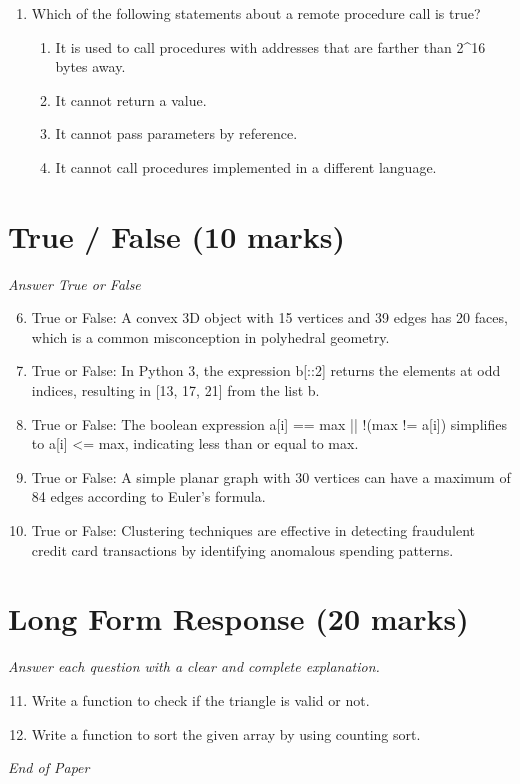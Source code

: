 \documentclass[12pt]{article}
\begin{document}
\begin{enumerate}[label=\arabic*.]
\begin{enumerate}[label=(\alph*)]
    \item 34.0
    \item 26.0
\end{enumerate}
\item Which of the following statements about a remote procedure call is true?
\begin{enumerate}[label=(\alph*)]
    \item It is used to call procedures with addresses that are farther than 2\^{}16 bytes away.
    \item It cannot return a value.
    \item It cannot pass parameters by reference.
    \item It cannot call procedures implemented in a different language.
\end{enumerate}
\end{enumerate}

\section*{True / False (10 marks)}
\textit{Answer True or False}
\begin{enumerate}[label=\arabic*.]
\setcounter{enumi}{5}
\item True or False: A convex 3D object with 15 vertices and 39 edges has 20 faces, which is a common misconception in polyhedral geometry.
\item True or False: In Python 3, the expression b[::2] returns the elements at odd indices, resulting in [13, 17, 21] from the list b.
\item True or False: The boolean expression a[i] == max || !(max != a[i]) simplifies to a[i] \textless{}= max, indicating less than or equal to max.
\item True or False: A simple planar graph with 30 vertices can have a maximum of 84 edges according to Euler's formula.
\item True or False: Clustering techniques are effective in detecting fraudulent credit card transactions by identifying anomalous spending patterns.
\end{enumerate}

\section*{Long Form Response (20 marks)}
\textit{Answer each question with a clear and complete explanation.}
\begin{enumerate}[label=\arabic*.]
\setcounter{enumi}{10}
\item Write a function to check if the triangle is valid or not.
\item Write a function to sort the given array by using counting sort.
\end{enumerate}

\vfill
\noindent\textit{End of Paper}
\end{document}
